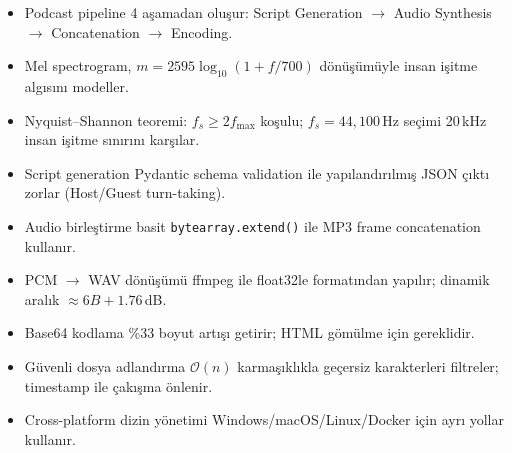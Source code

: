 \begin{ozet}
\begin{itemize}[leftmargin=1.5em]
  \item Podcast pipeline 4 a\c{s}amadan olu\c{s}ur: Script Generation $\to$ Audio Synthesis $\to$ Concatenation $\to$ Encoding.
  \item Mel spectrogram, $m = 2595 \log_{10}(1 + f/700)$ d\"{o}n\"{u}\c{s}\"{u}m\"{u}yle insan i\c{s}itme alg{\i}s{\i}n{\i} modeller.
  \item Nyquist--Shannon teoremi: $f_s \geq 2 f_{\max}$ ko\c{s}ulu; $f_s = 44{,}100$\,Hz se\c{c}imi 20\,kHz insan i\c{s}itme s{\i}n{\i}r{\i}n{\i} kar\c{s}{\i}lar.
  \item Script generation Pydantic schema validation ile yap{\i}land{\i}r{\i}lm{\i}\c{s} JSON \c{c}{\i}kt{\i} zorlar (Host/Guest turn-taking).
  \item Audio birle\c{s}tirme basit \texttt{bytearray.extend()} ile MP3 frame concatenation kullan{\i}r.
  \item PCM $\to$ WAV d\"{o}n\"{u}\c{s}\"{u}m\"{u} ffmpeg ile float32le format{\i}ndan yap{\i}l{\i}r; dinamik aral{\i}k $\approx 6B + 1.76$\,dB.
  \item Base64 kodlama \%33 boyut art{\i}\c{s}{\i} getirir; HTML g\"{o}m\"{u}lme i\c{c}in gereklidir.
  \item G\"{u}venli dosya adland{\i}rma $\mathcal{O}(n)$ karma\c{s}{\i}kl{\i}kla ge\c{c}ersiz karakterleri filtreler; timestamp ile \c{c}ak{\i}\c{s}ma \"{o}nlenir.
  \item Cross-platform dizin y\"{o}netimi Windows/macOS/Linux/Docker i\c{c}in ayr{\i} yollar kullan{\i}r.
\end{itemize}
\end{ozet}
